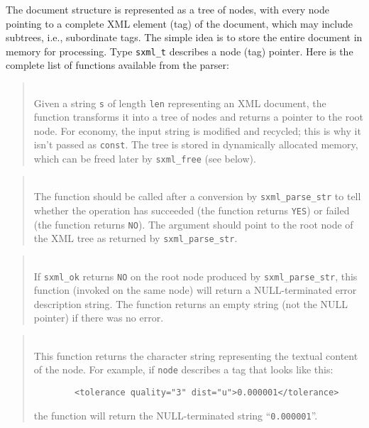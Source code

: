 The document structure is represented as a tree of nodes, with every node
pointing to a complete XML element (tag)
of the document, which may include subtrees,
i.e., subordinate tags.
The simple idea is to store the entire document in memory for processing.
Type {\tt sxml\_t} describes a node (tag) pointer.
Here is the complete list of functions available from the parser:

\begin{quote}
\noindent\hspace{-0.35in}{\tt sxml\_t sxml\_parse\_str (char *s, size\_t len); }\\ \hspace{0in}
Given a string {\tt s} of length {\tt len}
representing an XML document,
the function transforms it into a tree of nodes and returns
a pointer to the root node.
For economy, the input string is modified and recycled; this is why
it isn't passed as {\tt const}.
The tree is stored in dynamically allocated memory, which can be freed later
by {\tt sxml\_free} (see below).
\end{quote}

\begin{quote}
\noindent\hspace{-0.35in}{\tt int sxml\_ok (sxml\_t node); }\\ \hspace{0in}
The function should be called after a conversion by 
{\tt sxml\_parse\_str}
to tell whether the operation has succeeded (the function returns {\tt YES})
or failed (the function returns {\tt NO}).
The argument should point to the root node of the XML tree as returned by
{\tt sxml\_parse\_str}.
\end{quote}

\begin{quote}
\noindent\hspace{-0.35in}{\tt const char *sxml\_error
(sxml\_t node); }\\ \hspace{0in}
If {\tt sxml\_ok} returns {\tt NO} on the root node produced by
{\tt sxml\_parse\_str}, this function (invoked on the same node) will
return a NULL-terminated error description string.
The function returns an empty string (not the NULL pointer)
if there was no error.
\end{quote}

\begin{quote}
\noindent\hspace{-0.35in}{\tt char *sxml\_txt (sxml\_t node); }\\ \hspace{0in}
This function returns the character string representing the textual content
of the node.
For example, if {\tt node} describes a tag that looks like this:
\begin{verbatim}
        <tolerance quality="3" dist="u">0.000001</tolerance>
\end{verbatim}
\noindent
the function will return the NULL-terminated string ``{\tt 0.000001}''.
\end{quote}

